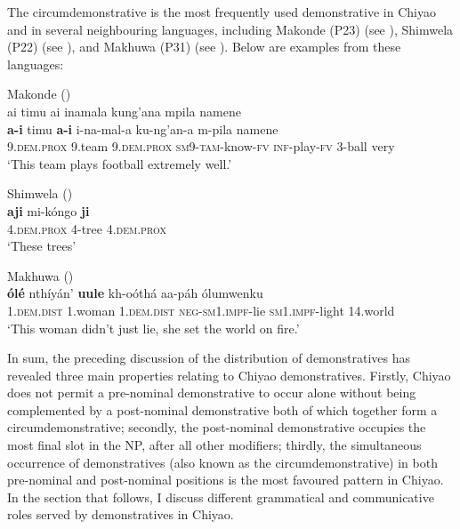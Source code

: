 \documentclass[output=paper,
            colorlinks, citecolor=brown
            ,draftmode
		  ]{langscibook}
\begin{document}
The circumdemonstrative is the most frequently used demonstrative in Chiyao and in several neighbouring languages, including Makonde (P23) (see \citealt{Makanjila2019}), Shimwela (P22) (see \citealt{TajiMreta2017}), and Makhuwa (P31) (see \citealt{vanderWal2010}). Below are examples from these languages:

\ea Makonde (\citealt[171]{Makanjila2019})\\
    \label{ex:taji:28}
     ai timu ai inamala kung’ana mpila namene \\
    \gll \textbf{a-i}                         timu          \textbf{a-i}                        i-na-mal-a    ku-ng’an-a          m-pila namene\\         
    9.\textsc{dem.prox}   9.team        9.\textsc{dem.prox}  \textsc{sm9-tam}-know-\textsc{fv} \textsc{inf}-play-\textsc{fv}      3-ball  very\\ 
    \glt ‘This team plays football extremely well.’ 

\ex Shimwela (\citealt{TajiMreta2017})\\
    \label{ex:taji:29}
    \gll \textbf{aji}                         mi-kóngo        \textbf{ji}\\
  4.\textsc{dem.prox}   4-tree              4.\textsc{dem.prox}\\
  \glt ‘These trees’   

\ex Makhuwa (\citealt[201]{vanderWal2010})\\
    \label{ex:taji:30}
    \gll \textbf{ólé}                      nthíyán’      \textbf{uule}                    kh-oóthá aa-páh                    ólumwenku\\     
    1.\textsc{dem.dist}    1.woman    1.\textsc{dem.dist}      \textsc{neg-sm1.impf}-lie \textsc{sm1.impf}-light    14.world\\
    \glt ‘This woman didn’t just lie, she set the world on fire.’ 
\z

In sum, the preceding discussion of the distribution of demonstratives has revealed three main properties relating to Chiyao demonstratives. Firstly, Chiyao does not permit a pre-nominal demonstrative to occur alone without being complemented by a post-nominal demonstrative both of which together form a circumdemonstrative; secondly, the post-nominal demonstrative occupies the most final slot in the NP, after all other modifiers; thirdly, the simultaneous occurrence of demonstratives (also known as the circumdemonstrative) in both pre-nominal and post-nominal positions is the most favoured pattern in Chiyao. In the section that follows, I discuss different grammatical and communicative roles served by demonstratives in Chiyao.
\end{document}
